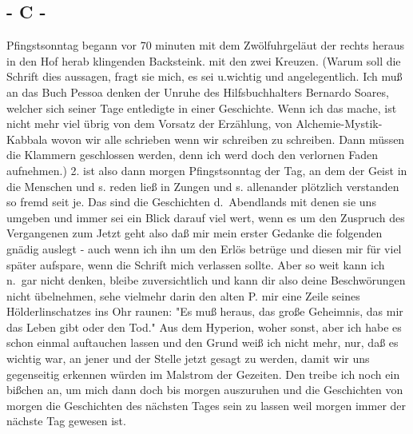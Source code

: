 \documentclass[
]{article}
\author{}
\date{\vspace{-2.5em}}
\begin{document}
\subsection{- C -}\label{c--}

Pfingstsonntag begann vor 70 minuten mit dem Zwölfuhrgeläut der rechts
heraus in den Hof herab klingenden Backsteink. mit den zwei Kreuzen.
(Warum soll die Schrift dies aussagen, fragt sie mich, es sei u.wichtig
und angelegentlich. Ich muß an das Buch Pessoa denken der Unruhe des
Hilfsbuchhalters Bernardo Soares, welcher sich seiner Tage entledigte in
einer Geschichte. Wenn ich das mache, ist nicht mehr viel übrig von dem
Vorsatz der Erzählung, von Alchemie-Mystik-Kabbala wovon wir alle
schrieben wenn wir schreiben zu schreiben. Dann müssen die Klammern
geschlossen werden, denn ich werd doch den verlornen Faden aufnehmen.)
2. ist also dann morgen Pfingstsonntag der Tag, an dem der Geist in die
Menschen und s. reden ließ in Zungen und s. allenander plötzlich
verstanden so fremd seit je. Das sind die Geschichten d.~Abendlands mit
denen sie uns umgeben und immer sei ein Blick darauf viel wert, wenn es
um den Zuspruch des Vergangenen zum Jetzt geht also daß mir mein erster
Gedanke die folgenden gnädig auslegt - auch wenn ich ihn um den Erlös
betrüge und diesen mir für viel später aufspare, wenn die Schrift mich
verlassen sollte. Aber so weit kann ich n.~gar nicht denken, bleibe
zuversichtlich und kann dir also deine Beschwörungen nicht übelnehmen,
sehe vielmehr darin den alten P. mir eine Zeile seines Hölderlinschatzes
ins Ohr raunen: "Es muß heraus, das große Geheimnis, das mir das Leben
gibt oder den Tod." Aus dem Hyperion, woher sonst, aber ich habe es
schon einmal auftauchen lassen und den Grund weiß ich nicht mehr, nur,
daß es wichtig war, an jener und der Stelle jetzt gesagt zu werden,
damit wir uns gegenseitig erkennen würden im Malstrom der Gezeiten. Den
treibe ich noch ein bißchen an, um mich dann doch bis morgen auszuruhen
und die Geschichten von morgen die Geschichten des nächsten Tages sein
zu lassen weil morgen immer der nächste Tag gewesen ist.
\end{document}
